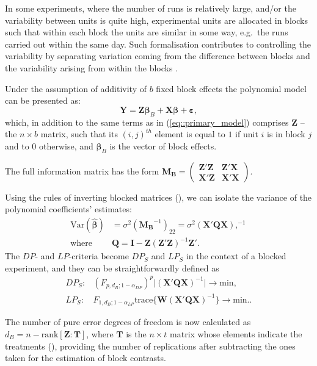 
In some experiments, where the number of runs is relatively large, and/or the variability between units is quite high, experimental units are allocated in blocks such that within each block the units are similar in some way, e.g.~the runs carried out within the same day. Such formalisation contributes to 
controlling the variability by separating variation coming from the difference between blocks and the variability arising from within the blocks \citep{Bailey2008design}.

Under the assumption of additivity of $b$ fixed block effects the polynomial model can be presented as:
\begin{equation}
\label{eq::blocked_model}
\bm{Y}=\bm{Z\beta}_B+\bm{X\beta}+\bm{\varepsilon},
\end{equation}
which, in addition to the same terms as in (\ref{eq::primary_model}) comprises $\bm{Z}$ -- the $n\times b$ matrix, such that its $(i,j)^{th}$ element is equal to $1$ if unit $i$ is in block $j$ and to $0$ otherwise, and $\bm{\beta}_B$ is the vector of block effects. 

The full information matrix has the form
$%
\bm{M_B}=
\begin{pmatrix}
\bm{Z}'\bm{Z} & \bm{Z}'\bm{X}\\
\bm{X}'\bm{Z} & \bm{X}'\bm{X}
\end{pmatrix}.     
$%

Using the rules of inverting blocked matrices (\citealp{Harville2006matrix}), we can isolate the variance of the polynomial coefficients' estimates:
\begin{align*}
\mbox{Var}(\hat{\bm{\beta}})&=\sigma^2(\bm{M_B}^{-1})_{22}=\sigma^2(\bm{X}'\bm{QX}),^{-1}\\
\mbox{where }&\bm{Q}=\bm{I}-\bm{Z}(\bm{Z}'\bm{Z})^{-1}\bm{Z}'.
\end{align*}
The $DP$- and $LP$-criteria become $DP_S$ and $LP_S$ in the context of a blocked experiment, and they can be straightforwardly defined as
\begin{align}
\label{eq::DPs_blocked}
DP_S: &(F_{p,d_B;1-\alpha_{DP}})^{p}\vert (\bm{X}'\bm{Q}\bm{X})^{-1}\vert \rightarrow \mbox{min,}\\
\label{eq::LPs_blocked}
LP_S: &F_{1,d_B;1-\alpha_{LP}}\mbox{trace}\{\bm{W}(\bm{X}'\bm{Q}\bm{X})^{-1}\} \rightarrow \mbox{min.}.
\end{align}

The number of pure error degrees of freedom is now calculated as $d_B=n-\mbox{rank}[\bm{Z}:\bm{T}]$, where $\bm{T}$ is the $n\times t$ matrix whose elements indicate the treatments (\citealp{GilmourTrinca2012}), providing the number of replications after subtracting the ones taken for the estimation of block contrasts.  

